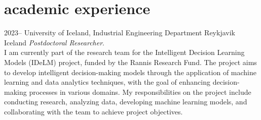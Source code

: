 \section{academic experience}
\begin{entrylist}
\entry
{2023--}
{University of Iceland, Industrial Engineering Department}
{Reykjavik Iceland}
{\emph{Postdoctoral Researcher}. \\
I am currently part of the research team for the Intelligent Decision Learning Models (IDeLM) project, funded by the Rannis Research Fund. The project aims to develop intelligent decision-making models through the application of machine learning and data analytics techniques, with the goal of enhancing decision-making processes in various domains. My responsibilities on the project include conducting research, analyzing data, developing machine learning models, and collaborating with the team to achieve project objectives.
}
\end{entrylist}
\clearpage
\removeaside
